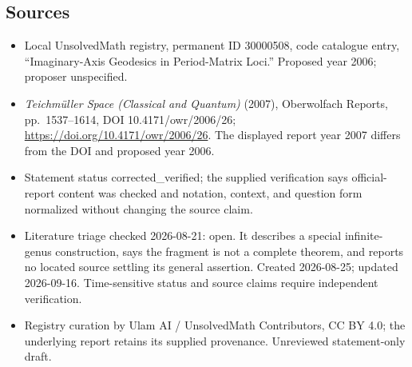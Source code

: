 \documentclass[11pt]{article}
\begin{document}
\subsection{Sources}
\begin{itemize}
\item Local UnsolvedMath registry, permanent ID 30000508, code catalogue entry, ``Imaginary-Axis Geodesics in Period-Matrix Loci.'' Proposed year 2006; proposer unspecified.
\item \emph{Teichm\"uller Space (Classical and Quantum)} (2007), Oberwolfach Reports, pp.\ 1537--1614, DOI 10.4171/owr/2006/26; \url{https://doi.org/10.4171/owr/2006/26}. The displayed report year 2007 differs from the DOI and proposed year 2006.
\item Statement status corrected\_verified; the supplied verification says official-report content was checked and notation, context, and question form normalized without changing the source claim.
\item Literature triage checked 2026-08-21: open. It describes a special infinite-genus construction, says the fragment is not a complete theorem, and reports no located source settling its general assertion. Created 2026-08-25; updated 2026-09-16. Time-sensitive status and source claims require independent verification.
\item Registry curation by Ulam AI / UnsolvedMath Contributors, CC BY 4.0; the underlying report retains its supplied provenance. Unreviewed statement-only draft.
\end{itemize}
\end{document}
